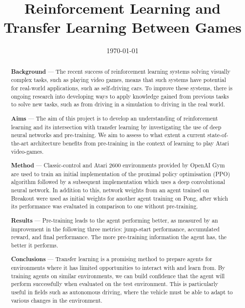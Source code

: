 \documentclass[12pt,a4paper]{article}
\title{Reinforcement Learning and \\ Transfer Learning Between Games}
\author{} %
\date{\today}
\begin{document}
\maketitle

\begin{abstract}

\begin{flushleft} 
{\bf Background} --- The recent success of reinforcement learning systems solving visually complex tasks, such as playing video games, means that such systems have potential for real-world applications, such as self-driving cars. To improve these systems, there is ongoing research into developing ways to apply knowledge gained from previous tasks to solve new tasks, such as from driving in a simulation to driving in the real world.
\end{flushleft}

\begin{flushleft}
{\bf Aims} --- The aim of this project is to develop an understanding of reinforcement learning and its intersection with transfer learning by investigating the use of deep neural networks and pre-training. We aim to assess to what extent a current state-of-the-art architecture benefits from pre-training in the context of learning to play Atari video-games.
\end{flushleft}

\begin{flushleft}
{\bf Method} --- Classic-control and Atari 2600 environments provided by OpenAI Gym are used to train an initial implementation of the proximal policy optimisation (PPO) algorithm followed by a subsequent implementation which uses a deep convolutional neural network. In addition to this, network weights from an agent trained on Breakout were used as initial weights for another agent training on Pong, after which its performance was evaluated in comparison to one without pre-training. 
\end{flushleft}

\begin{flushleft}
{\bf Results} --- Pre-training leads to the agent performing better, as measured by an improvement in the following three metrics: jump-start performance, accumulated reward, and final performance. The more pre-training information the agent has, the better it performs. 
\end{flushleft}

\begin{flushleft}
{\bf Conclusions} --- Transfer learning is a promising method to prepare agents for environments where it has limited opportunities to interact with and learn from. By training agents on similar environments, we can build confidence that the agent will perform successfully when evaluated on the test environment. This is particularly useful in fields such as autonomous driving, where the vehicle must be able to adapt to various changes in the environment.
\end{flushleft}

\end{abstract}
\end{document}
